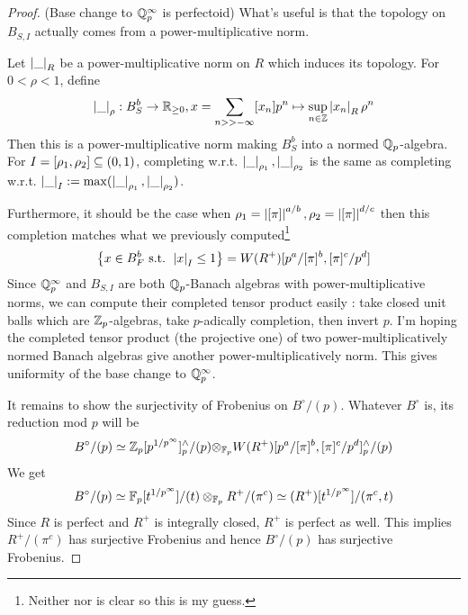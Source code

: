 \documentclass{article}
\begin{document}
\begin{proof}
  (Base change to $\mathbb{Q}_p^\infty$ is perfectoid)
  What's useful is that 
  the topology on $B_{S , I}$ actually comes from a power-multiplicative norm.
  \begin{lem}
    
    Let $\left\vert \_ \right\vert_R$ be a power-multiplicative norm on $R$
    which induces its topology.
    For $0 < \rho < 1$,
    define \[
    \left\vert \_ \right\vert_\rho : B^b_{S} \to \mathbb{R}_{\geq 0} , 
    x = \sum_{n >> -\infty} [x_n] p^n 
    \mapsto \sup_{n \in \mathbb{Z}} \left\vert x_n \right\vert_R \rho^n
    \]
    Then this is a power-multiplicative norm
    making $B^b_S$ into a normed $\mathbb{Q}_p$-algebra.
    For $I = [\rho_1 , \rho_2] \subseteq (0,1)$,
    completing w.r.t. $\left\vert \_ \right\vert_{\rho_1} , \left\vert \_ \right\vert_{\rho_2}$
    is the same as completing w.r.t.
    $\left\vert \_ \right\vert_I := \max(\left\vert \_ \right\vert_{\rho_1} , \left\vert \_ \right\vert_{\rho_2})$.
    \cite[Section 7.1.1]{Far24}
  \end{lem}
  Furthermore, it should be the case
  when $\rho_1 = \left\vert [\pi] \right\vert^{a / b} , \rho_2 = \left\vert [\pi] \right\vert^{d / c}$
  then this completion matches what we previously computed\footnote{
    Neither \cite[Section 5.1]{KL15} nor \cite[Prop. II.1.1]{FS24}
    is clear so this is my guess.
  }
  \begin{align*}
    \left\{x \in B^b_F \text{ s.t. } \left\vert x \right\vert_I \leq 1\right\} = 
    W(R^+)[p^a / [\pi]^b , [\pi]^c / p^d]\\
  \end{align*}
  Since $\mathbb{Q}_p^\infty$ and $B_{S , I}$ are both 
  $\mathbb{Q}_p$-Banach algebras with power-multiplicative norms,
  we can compute their completed tensor product easily : 
  take closed unit balls which are $\mathbb{Z}_p$-algebras,
  take $p$-adically completion, then invert $p$.
  I'm hoping the completed tensor product (the projective one) of
  two power-multiplicatively normed Banach algebras
  give another power-multiplicatively norm.
  This gives uniformity of the base change to $\mathbb{Q}_p^\infty$.

  It remains to show the surjectivity of Frobenius on $B^\circ / (p)$.
  Whatever $B^\circ$ is,
  its reduction mod $p$ will be \[
    B^\circ / (p) \simeq 
    \mathbb{Z}_p[p^{1/p^\infty}]^\wedge_p / (p) {\otimes}_{\mathbb{F}_p}
    W(R^+)[p^a / [\pi]^b , [\pi]^c / p^d]^\wedge_p / (p)
  \]
  We get \[
    B^\circ / (p) \simeq \mathbb{F}_p[t^{1 / p^\infty}] / (t) \otimes_{\mathbb{F}_p}
      R^+ / (\pi^c)
      \simeq (R^+)[t^{1 / p^\infty}] / (\pi^c , t) 
  \]
  Since $R$ is perfect and $R^+$ is integrally closed,
  $R^+$ is perfect as well.
  This implies $R^+ / (\pi^c)$ has surjective Frobenius
  and hence $B^\circ / (p)$ has surjective Frobenius.


\end{proof}
\end{document}

